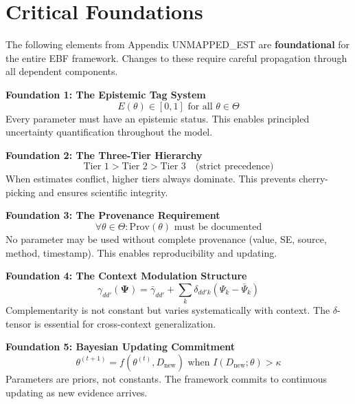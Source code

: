 \documentclass[11pt,a4paper]{article}
\theoremstyle{definition}
\begin{document}

\section{Critical Foundations}
\label{sec:bbb-critical-foundations}

\begin{tcolorbox}[colback=red!5!white, colframe=red!75!black, 
    title=\textbf{Critical Foundations for EBF}]

The following elements from Appendix UNMAPPED_EST are \textbf{foundational} for the 
entire EBF framework. Changes to these require careful propagation through 
all dependent components.

\textbf{Foundation 1: The Epistemic Tag System}
\begin{equation}
E(\theta) \in [0, 1] \text{ for all } \theta \in \Theta
\end{equation}
Every parameter must have an epistemic status. This enables principled 
uncertainty quantification throughout the model.

\textbf{Foundation 2: The Three-Tier Hierarchy}
\begin{equation}
\text{Tier 1} > \text{Tier 2} > \text{Tier 3} \quad \text{(strict precedence)}
\end{equation}
When estimates conflict, higher tiers always dominate. This prevents 
cherry-picking and ensures scientific integrity.

\textbf{Foundation 3: The Provenance Requirement}
\begin{equation}
\forall \theta \in \Theta: \text{Prov}(\theta) \text{ must be documented}
\end{equation}
No parameter may be used without complete provenance (value, SE, source, 
method, timestamp). This enables reproducibility and updating.

\textbf{Foundation 4: The Context Modulation Structure}
\begin{equation}
\gamma_{dd'}(\boldsymbol{\Psi}) = \bar{\gamma}_{dd'} + \sum_k \delta_{dd'k} (\Psi_k - \bar{\Psi}_k)
\end{equation}
Complementarity is not constant but varies systematically with context. 
The $\delta$-tensor is essential for cross-context generalization.

\textbf{Foundation 5: Bayesian Updating Commitment}
\begin{equation}
\theta^{(t+1)} = f(\theta^{(t)}, D_{\text{new}}) \text{ when } I(D_{\text{new}}; \theta) > \kappa
\end{equation}
Parameters are priors, not constants. The framework commits to continuous 
updating as new evidence arrives.

\end{tcolorbox}
\end{document}

